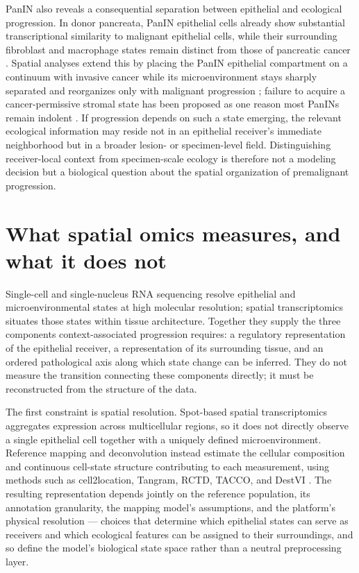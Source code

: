PanIN also reveals a consequential separation between epithelial and
ecological progression. In donor pancreata, PanIN epithelial cells already
show substantial transcriptional similarity to malignant epithelial cells,
while their surrounding fibroblast and macrophage states remain distinct from
those of pancreatic cancer \autocite{Carpenter2023-qs}. Spatial analyses extend
this by placing the PanIN epithelial compartment on a continuum with invasive
cancer while its microenvironment stays sharply separated and reorganizes only
with malignant progression \autocite{Elhossiny2026-pq}; failure to acquire a
cancer-permissive stromal state has been proposed as one reason most PanINs
remain indolent \autocite{Elhossiny2026-pq}. If progression depends on such a
state emerging, the relevant ecological information may reside not in an
epithelial receiver's immediate neighborhood but in a broader lesion- or
specimen-level field. Distinguishing receiver-local context from
specimen-scale ecology is therefore not a modeling decision but a biological
question about the spatial organization of premalignant progression.


\section{What spatial omics measures, and what it does not}
\label{sec:intro-measurement}

Single-cell and single-nucleus RNA sequencing resolve epithelial and
microenvironmental states at high molecular resolution; spatial
transcriptomics situates those states within tissue architecture. Together
they supply the three components context-associated progression requires: a
regulatory representation of the epithelial receiver, a representation of its
surrounding tissue, and an ordered pathological axis along which state change
can be inferred. They do not measure the transition connecting these
components directly; it must be reconstructed from the structure of the data.

The first constraint is spatial resolution. Spot-based spatial
transcriptomics aggregates expression across multicellular regions, so it
does not directly observe a single epithelial cell together with a uniquely
defined microenvironment. Reference mapping and deconvolution instead
estimate the cellular composition and continuous cell-state structure
contributing to each measurement, using methods such as cell2location,
Tangram, RCTD, TACCO, and DestVI
\autocite{Kleshchevnikov2022-ki,Biancalani2021-bt,Cable2022-tb,Mages2023-wj,Lopez2022-ps}.
The resulting representation depends jointly on the reference population, its
annotation granularity, the mapping model's assumptions, and the platform's
physical resolution --- choices that determine which epithelial states can
serve as receivers and which ecological features can be assigned to their
surroundings, and so define the model's biological state space rather than a
neutral preprocessing layer.

